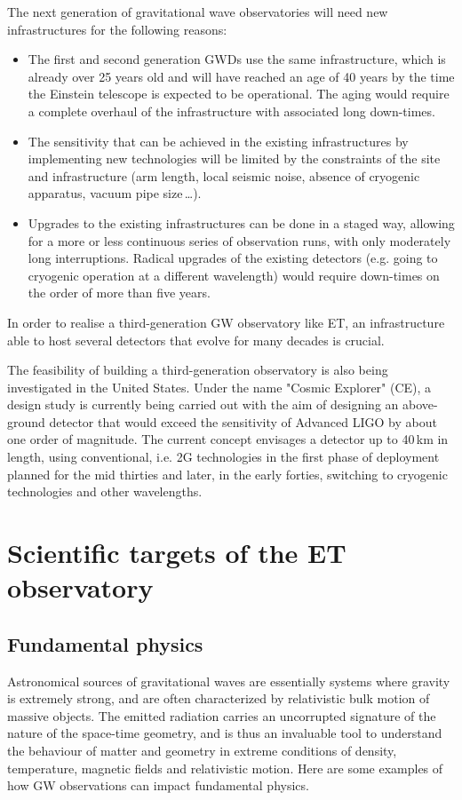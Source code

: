 The next generation of gravitational wave observatories will need new infrastructures for the following reasons:
\begin{itemize}
    \item The first and second generation GWDs use the same infrastructure, which is already over 25 years old and will have reached an age of 40 years by the time the Einstein telescope is expected to be operational. The aging would require a complete overhaul of the infrastructure with associated long down-times.
    \item The sensitivity that can be achieved in the existing infrastructures by implementing new technologies will be limited by the constraints of the site and infrastructure (arm length, local seismic noise, absence of cryogenic apparatus, vacuum pipe size\,\ldots).
    \item Upgrades to the existing infrastructures can be done in a staged way, allowing for a more or less continuous series of observation runs, with only moderately long interruptions. Radical upgrades of the existing detectors (e.g. going to cryogenic operation at a different wavelength) would require down-times on the order of more than five years. 
\end{itemize} 
In order to realise a third-generation GW observatory like ET, an infrastructure able to host several detectors that evolve for many decades is crucial.

The feasibility of building a third-generation observatory is also being investigated in the United States. Under the name "Cosmic Explorer" (CE), a design study is currently being carried out with the aim of designing an above-ground detector that would exceed the sensitivity of Advanced LIGO by about one order of magnitude. The current concept envisages a detector up to 40\,km in length, using conventional, i.e. 2G technologies in the first phase of deployment planned for the mid thirties and later, in the early forties, switching to cryogenic technologies and other wavelengths. 


\clearpage

\section{Scientific targets of the ET observatory}
\subsection{Fundamental physics}
\label{ScienceCase:FundamentalPhysics}
Astronomical sources of gravitational waves are essentially systems where gravity is extremely strong, and are often characterized by relativistic bulk motion of massive objects. The emitted radiation carries an uncorrupted signature of the nature of the space-time geometry, and is thus an invaluable tool to understand the behaviour of matter and geometry in extreme conditions of density, temperature, magnetic fields and relativistic motion. Here are some examples of how GW observations can impact fundamental physics.

